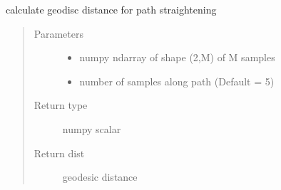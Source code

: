 \documentclass[letterpaper,10pt,english]{sphinxmanual}
\begin{document}
\begin{fulllineitems}
\label{\detokenize{geodesic:geodesic.geod_dist_path_strt}}
calculate geodisc distance for path straightening
\begin{quote}\begin{description}
\item[{Parameters}] \leavevmode\begin{itemize}
\item {} 
 \textendash{} numpy ndarray of shape (2,M) of M samples

\item {} 
 \textendash{} number of samples along path (Default = 5)

\end{itemize}

\item[{Return type}] \leavevmode
numpy scalar

\item[{Return dist}] \leavevmode
geodesic distance

\end{description}\end{quote}

\end{fulllineitems}

\end{document}
